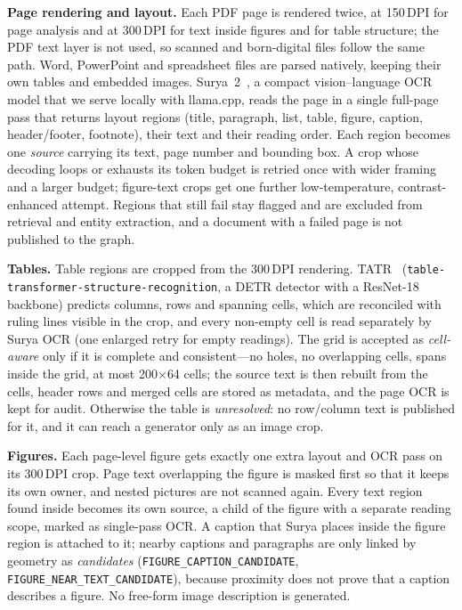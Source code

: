 \documentclass[conference]{IEEEtran}
\begin{document}


\textbf{Page rendering and layout.} Each PDF page is rendered twice, at 150\,DPI for page analysis and at 300\,DPI for text inside figures and for table structure; the PDF text layer is not used, so scanned and born-digital files follow the same path. Word, PowerPoint and spreadsheet files are parsed natively, keeping their own tables and embedded images. Surya~2~\cite{paruchuri2024surya}, a compact vision--language OCR model that we serve locally with llama.cpp, reads the page in a single full-page pass that returns layout regions (title, paragraph, list, table, figure, caption, header/footer, footnote), their text and their reading order. Each region becomes one \emph{source} carrying its text, page number and bounding box. A crop whose decoding loops or exhausts its token budget is retried once with wider framing and a larger budget; figure-text crops get one further low-temperature, contrast-enhanced attempt. Regions that still fail stay flagged and are excluded from retrieval and entity extraction, and a document with a failed page is not published to the graph.

\textbf{Tables.} Table regions are cropped from the 300\,DPI rendering. TATR~\cite{smock2022pubtables} (\texttt{table-transformer-structure-recognition}, a DETR detector with a ResNet-18 backbone) predicts columns, rows and spanning cells, which are reconciled with ruling lines visible in the crop, and every non-empty cell is read separately by Surya OCR (one enlarged retry for empty readings). The grid is accepted as \emph{cell-aware} only if it is complete and consistent---no holes, no overlapping cells, spans inside the grid, at most 200$\times$64 cells; the source text is then rebuilt from the cells, header rows and merged cells are stored as metadata, and the page OCR is kept for audit. Otherwise the table is \emph{unresolved}: no row/column text is published for it, and it can reach a generator only as an image crop.

\textbf{Figures.} Each page-level figure gets exactly one extra layout and OCR pass on its 300\,DPI crop. Page text overlapping the figure is masked first so that it keeps its own owner, and nested pictures are not scanned again. Every text region found inside becomes its own source, a child of the figure with a separate reading scope, marked as single-pass OCR. A caption that Surya places inside the figure region is attached to it; nearby captions and paragraphs are only linked by geometry as \emph{candidates} (\texttt{FIGURE\_CAPTION\_CANDIDATE}, \texttt{FIGURE\_NEAR\_TEXT\_CANDIDATE}), because proximity does not prove that a caption describes a figure. No free-form image description is generated.
\end{document}
